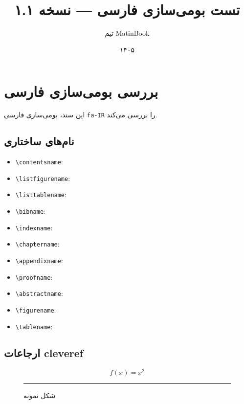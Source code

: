 \documentclass{matinbook}
\title{تست بومی‌سازی فارسی — نسخه ۱.۱}
\author{تیم MatinBook}
\date{۱۴۰۵}
\begin{document}
\maketitle

\tableofcontents

\chapter{بررسی بومی‌سازی فارسی}
\label{chap:test-locale}

این سند، بومی‌سازی فارسی \texttt{fa-IR} را بررسی می‌کند.

\section{نام‌های ساختاری}
\label{sec:structure-names}

\begin{itemize}
    \item \verb|\contentsname|: \contentsname
    \item \verb|\listfigurename|: \listfigurename
    \item \verb|\listtablename|: \listtablename
    \item \verb|\bibname|: \bibname
    \item \verb|\indexname|: \indexname
    \item \verb|\chaptername|: \chaptername
    \item \verb|\appendixname|: \appendixname
    \item \verb|\proofname|: \proofname
    \item \verb|\abstractname|: \abstractname
    \item \verb|\figurename|: \figurename
    \item \verb|\tablename|: \tablename
\end{itemize}

\section{ارجاعات cleveref}
\label{sec:cleveref-names}

\begin{equation}
    \label{eq:locale-test}
    f(x) = x^2
\end{equation}

\begin{figure}[h]
\centering
\rule{3cm}{2cm}
\caption{شکل نمونه}
\label{fig:locale-test}
\end{figure}
\end{document}
